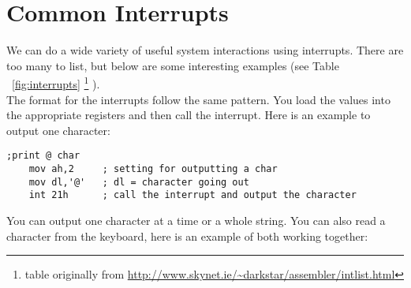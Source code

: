 \section{Common Interrupts}
We can do a wide variety of useful system interactions using interrupts.  There are too many to list, but below are some interesting examples (see Table ~\ref{fig:interrupts} \footnote{table originally from \url{http://www.skynet.ie/~darkstar/assembler/intlist.html}}
).  \\
\indent The format for the interrupts follow the same pattern.  You load the values into the appropriate registers and then call the interrupt.  Here is an example to output one character:
\begin{lstlisting}[language={[x86masm]Assembler}]
    ;print @ char
    mov ah,2     ; setting for outputting a char
    mov dl,'@'   ; dl = character going out  
    int 21h      ; call the interrupt and output the character
\end{lstlisting}
You can output one character at a time or a whole string.  You can also read a character from the keyboard, here is an example of both working together:

